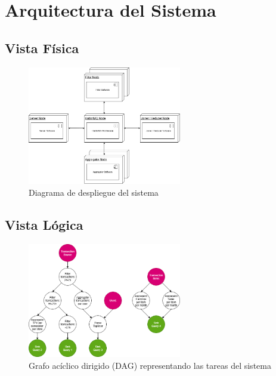 \section{Arquitectura del Sistema}

\subsection{Vista Física}

\begin{figure}[H]
    \centering
    \includegraphics[width=0.6\textwidth]{imagenes/vistas/despliegue.png}
    \caption{Diagrama de despliegue del sistema}
    \label{fig:despliegue}
\end{figure}

\subsection{Vista Lógica}

\begin{figure}[H]
    \centering
    \includegraphics[width=0.6\textwidth]{imagenes/vistas/dag.png}
    \caption{Grafo acíclico dirigido (DAG) representando las tareas del sistema}
    \label{fig:dag}
\end{figure}

